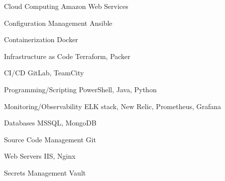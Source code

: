 \usepackage{multicol}

\begin{cvskills}
\begin{multicols}{2}


\cvskill
{Cloud Computing} %
{ %
 Amazon Web Services
}


\cvskill
{Configuration Management} %
{ %
 Ansible
}


\cvskill
{Containerization} %
{ %
Docker
}


\cvskill
{Infrastructure as Code} %
{ %
  Terraform,
  Packer
}


\cvskill
{CI/CD} %
{ %
  GitLab,
  TeamCity
}


\cvskill
{Programming/Scripting} %
{ %
  PowerShell,
  Java,
  Python
}


\cvskill
{Monitoring/Observability} %
{ %
  ELK stack,
  New Relic,
  Prometheus,
  Grafana
}


\cvskill
{Databases} %
{ %
  MSSQL,
  MongoDB
}


\cvskill
{Source Code Management} %
{ %
  Git
}


\cvskill
{Web Servers} %
{ %
  IIS,
  Nginx
}


\cvskill
{Secrets Management} %
{ %
  Vault
}

\end{multicols}
\end{cvskills}
